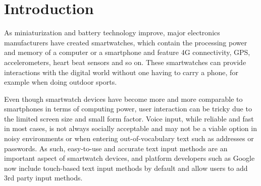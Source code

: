 \chapter{Introduction}
\label{c:intro}



As miniaturization and battery technology improve, major electronics manufacturers have created smartwatches, which contain the processing power and memory of a computer or a smartphone and feature 4G connectivity, GPS, accelerometers, heart beat sensors and so on. These smartwatches can provide interactions with the digital world without one having to carry a phone, for example when doing outdoor sports.

Even though smartwatch devices have become more and more comparable to smartphones in terms of computing power, user interaction can be tricky due to the limited screen size and small form factor. Voice input, while reliable and fast in most cases, is not always socially acceptable and may not be a viable option in noisy environments or when entering out-of-vocabulary text such as addresses or passwords. As such, easy-to-use and accurate text input methods are an important aspect of smartwatch devices, and platform developers such as Google now include touch-based text input methods by default and allow users to add 3rd party input methods.


